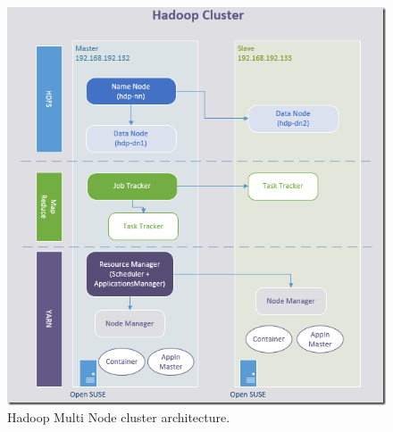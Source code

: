 \documentclass[a4paper,10pt]{article}
\begin{document}
\begin{enumerate}
\begin{enumerate}
	 
	 \begin{figure}[h]
	 	\includegraphics[scale=0.45,center]{exptFourScreenShot/HadoopMultiNode.png}
	 	\caption{Hadoop Multi Node cluster architecture.}
	 	\label{fig:0.0.2}
	 \end{figure}
	\end{enumerate}
\end{enumerate}
\end{document}
